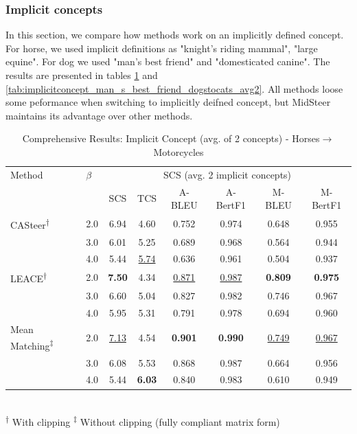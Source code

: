 \subsubsection{Implicit concepts}

In this section, we compare how methods work on an implicitly defined concept. For horse, we used implicit definitions as "knight's riding mammal", "large equine". For dog we used "man's best friend" and "domesticated canine". The results are presented in tables \ref{tab:implicitconcept_knight_s_riding_mammal_horsestomotorcycles_avg2} and \ref{tab:implicitconcept_man_s_best_friend_dogstocats_avg2}. All methods loose some peformance when switching to implicitly deifned concept, but MidSteer maintains its advantage over other methods.



\begin{table}[htbp]
\centering
\caption{Comprehensive Results: Implicit Concept (avg. of 2 concepts) - Horses$\to$Motorcycles}
\label{tab:implicitconcept_knight_s_riding_mammal_horsestomotorcycles_avg2}
\begin{tabular}{l|l|cccccc|}
\hline
Method & $\beta$ & \multicolumn{6}{c|}{SCS (avg. 2 implicit concepts)} \\
 &  & SCS & TCS & A-BLEU & A-BertF1 & M-BLEU & M-BertF1 \\
\hline
CASteer\textsuperscript{†} & 2.0 & 6.94 & 4.60 & 0.752 & 0.974 & 0.648 & 0.955 \\
 & 3.0 & 6.01 & 5.25 & 0.689 & 0.968 & 0.564 & 0.944 \\
 & 4.0 & 5.44 & \underline{5.74} & 0.636 & 0.961 & 0.504 & 0.937 \\
\hline
LEACE\textsuperscript{†} & 2.0 & \textbf{7.50} & 4.34 & \underline{0.871} & \underline{0.987} & \textbf{0.809} & \textbf{0.975} \\
 & 3.0 & 6.60 & 5.04 & 0.827 & 0.982 & 0.746 & 0.967 \\
 & 4.0 & 5.95 & 5.31 & 0.791 & 0.978 & 0.694 & 0.960 \\
\hline
Mean Matching\textsuperscript{‡} & 2.0 & \underline{7.13} & 4.54 & \textbf{0.901} & \textbf{0.990} & \underline{0.749} & \underline{0.967} \\
 & 3.0 & 6.08 & 5.53 & 0.868 & 0.987 & 0.664 & 0.956 \\
 & 4.0 & 5.44 & \textbf{6.03} & 0.840 & 0.983 & 0.610 & 0.949 \\
\hline
\end{tabular}
\\[0.5em]
\footnotesize
\textsuperscript{†} With clipping \quad \textsuperscript{‡} Without clipping (fully compliant matrix form)
\end{table}